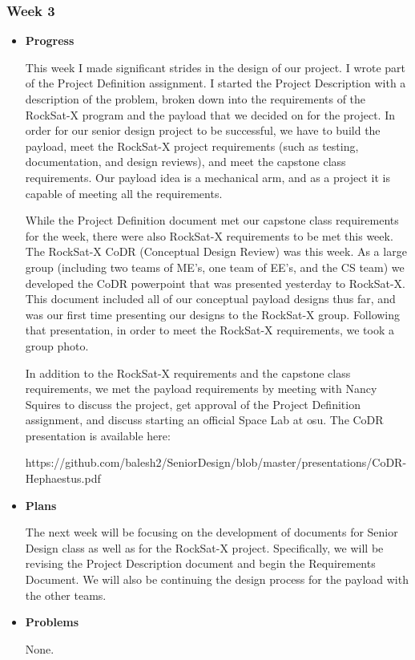 \subsubsection{Week 3}
\begin{itemize}
\item{
\textbf{Progress}

This week I made significant strides in the design of our project. I wrote part of the Project Definition assignment. I started the Project Description with a description of the problem, broken down into the requirements of the RockSat-X program and the \gls{payload} that we decided on for the project. In order for our senior design project to be successful, we have to build the \gls{payload}, meet the RockSat-X project requirements (such as testing, documentation, and design reviews), and meet the capstone class requirements. Our \gls{payload} idea is a mechanical arm, and as a project it is capable of meeting all the requirements.

While the Project Definition document met our capstone class requirements for the week, there were also RockSat-X requirements to be met this week. The RockSat-X CoDR (Conceptual Design Review) was this week. As a large group (including two teams of ME's, one team of EE's, and the CS team) we developed the CoDR powerpoint that was presented yesterday to RockSat-X. This document included all of our conceptual \gls{payload} designs thus far, and was our first time presenting our designs to the RockSat-X group. Following that presentation, in order to meet the RockSat-X requirements, we took a group photo.

In addition to the RockSat-X requirements and the capstone class requirements,
we met the \gls{payload} requirements by meeting with Nancy Squires to discuss
the project, get approval of the Project Definition assignment, and discuss
starting an official Space Lab at \gls{osu}. The CoDR presentation is available here: 

https://github.com/balesh2/SeniorDesign/blob/master/presentations/CoDR-Hephaestus.pdf
}

\item{
\textbf{Plans}

The next week will be focusing on the development of documents for Senior Design class as well as for the RockSat-X project. Specifically, we will be revising the Project Description document and begin the Requirements Document. We will also be continuing the design process for the \gls{payload} with the other teams.
}

\item{
\textbf{Problems}

None.
}
\end{itemize}

